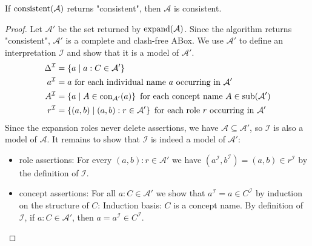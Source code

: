 \begin{lemma}[Soundness]\label{lem:4.5}
	If $\operatorname{\text{consistent}}(\mathcal{A})$ returns "consistent", then $\mathcal{A}$ is consistent.
\end{lemma}
\begin{proof}
	Let $\mathcal{A}'$ be the set returned by $\operatorname{\text{expand}}(\mathcal{A})$.
	Since the algorithm returns "consistent", $\mathcal{A}'$ is a complete and clash-free ABox.
	We use $\mathcal{A}'$ to define an interpretation $\mathcal{I}$ and show that it is a model of $\mathcal{A}'$.
	\begin{align*}
		\Delta^\mathcal{I} &= \left\{ a \mid a:C \in \mathcal{A}' \right\}\\
		a^\mathcal{I} &= a \text{ for each individual name $a$ occurring in $\mathcal{A}'$} \\
		A^\mathcal{I} &= \left\{ a \mid A \in \operatorname{\text{con}}_{\mathcal{A}'}(a) \right\} \text{ for each concept name } A \in \operatorname{\text{sub}}(\mathcal{A'}) \\
		r^\mathcal{I} &= \left\{ (a,b) \mid (a,b):r \in \mathcal{A}' \right\} \text{ for each role $r$ occurring in $\mathcal{A}'$}
	\end{align*}
	Since the expansion roles never delete assertions, we have $\mathcal{A} \subseteq \mathcal{A}'$, so $\mathcal{I}$ is also a model of $\mathcal{A}$.
	It remains to show that $\mathcal{I}$ is indeed a model of $\mathcal{A}'$:
	\begin{itemize}
		\item role assertions: For every $(a,b) : r \in \mathcal{A}'$ we have $(a^\mathcal{I},b^\mathcal{I}) = (a,b) \in r^\mathcal{I}$ by the definition of $\mathcal{I}$.
		\item concept assertions: For all $a : C \in \mathcal{A}'$ we show that $a^\mathcal{I} = a \in C^\mathcal{I}$ by induction on the structure of $C$:
			Induction basis: $C$ is a concept name.
			By definition of $\mathcal{I}$, if $a : C \in \mathcal{A}'$, then $a = a^\mathcal{I} \in C^\mathcal{I}$.


\end{itemize}
\end{proof}
